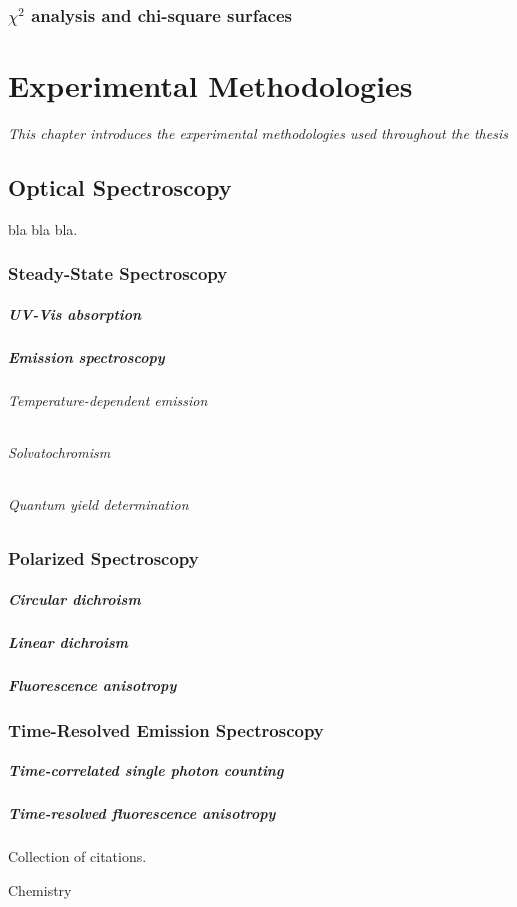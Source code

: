 \subsection{$\chi^2$ analysis and chi-square surfaces}


\chapter{Experimental Methodologies}
\label{chap:Methodologies}
\textit{This chapter introduces the experimental methodologies used throughout the thesis}
\vspace{2ex}\vfill
\minitoc
\newpage

\section{Optical Spectroscopy}
  bla bla bla.%
\subsection{Steady-State Spectroscopy}
\paragraph{UV-Vis absorption}
\paragraph{Emission spectroscopy}
\subparagraph{Temperature-dependent emission}
\subparagraph{Solvatochromism}
\subparagraph{Quantum yield determination}

\subsection{Polarized Spectroscopy}
\paragraph{Circular dichroism}
\paragraph{Linear dichroism}
\paragraph{Fluorescence anisotropy}

\subsection{Time-Resolved Emission Spectroscopy}
\paragraph{Time-correlated single photon counting}
\paragraph{Time-resolved fluorescence anisotropy}

Collection of citations.%


Chemistry 
